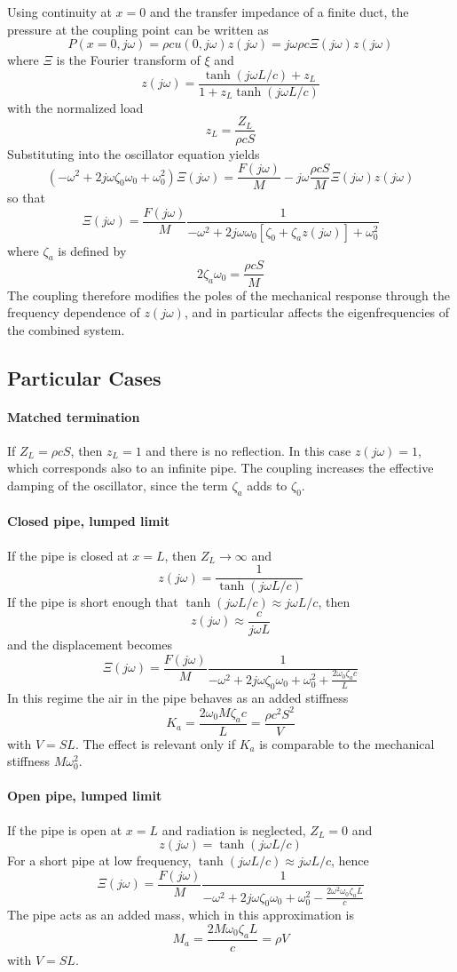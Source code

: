 Using continuity at \( x=0 \) and the transfer impedance of a finite duct, the pressure at the coupling point can be written as
\[
P(x=0,j\omega)=\rho c u(0,j\omega)z(j\omega)=j\omega\rho c \Xi(j\omega)z(j\omega)
\]
where \( \Xi \) is the Fourier transform of \( \xi \) and
\[
z(j\omega)=\frac{\tanh(j\omega L/c)+z_{L}}{1+z_{L}\tanh(j\omega L/c)}
\]
with the normalized load
\[
z_{L}=\frac{Z_{L}}{\rho c S}
\]
Substituting into the oscillator equation yields
\[
\left(-\omega^{2}+2j\omega\zeta_{0}\omega_{0}+\omega_{0}^{2}\right)\Xi(j\omega)=\frac{F(j\omega)}{M}-j\omega\frac{\rho c S}{M}\Xi(j\omega)z(j\omega)
\]
so that
\[
\Xi(j\omega)=\frac{F(j\omega)}{M}\frac{1}{-\omega^{2}+2j\omega\omega_{0}\left[\zeta_{0}+\zeta_{a}z(j\omega)\right]+\omega_{0}^{2}}
\]
where \( \zeta_{a} \) is defined by
\[
2\zeta_{a}\omega_{0}=\frac{\rho c S}{M}
\]
The coupling therefore modifies the poles of the mechanical response through the frequency dependence of \( z(j\omega) \), and in particular affects the eigenfrequencies of the combined system. 

\subsection{Particular Cases}

\paragraph{Matched termination} If \( Z_{L}=\rho c S \), then \( z_{L}=1 \) and there is no reflection. In this case \( z(j\omega)=1 \), which corresponds also to an infinite pipe. The coupling increases the effective damping of the oscillator, since the term \( \zeta_{a} \) adds to \( \zeta_{0} \).

\paragraph{Closed pipe, lumped limit} If the pipe is closed at \( x=L \), then \( Z_{L}\to\infty \) and
\[
z(j\omega)=\frac{1}{\tanh(j\omega L/c)}
\]
If the pipe is short enough that \( \tanh(j\omega L/c)\approx j\omega L/c \), then
\[
z(j\omega)\approx\frac{c}{j\omega L}
\]
and the displacement becomes
\[
\Xi(j\omega)=\frac{F(j\omega)}{M}\frac{1}{-\omega^{2}+2j\omega\zeta_{0}\omega_{0}+\omega_{0}^{2}+\frac{2\omega_{0}\zeta_{a}c}{L}}
\]
In this regime the air in the pipe behaves as an added stiffness
\[
K_{a}=\frac{2\omega_{0}M\zeta_{a}c}{L}=\frac{\rho c^{2}S^{2}}{V}
\]
with \( V=SL \). The effect is relevant only if \( K_{a} \) is comparable to the mechanical stiffness \( M\omega_{0}^{2} \). 

\paragraph{Open pipe, lumped limit} If the pipe is open at \( x=L \) and radiation is neglected, \( Z_{L}=0 \) and
\[
z(j\omega)=\tanh(j\omega L/c)
\]
For a short pipe at low frequency, \( \tanh(j\omega L/c)\approx j\omega L/c \), hence
\[
\Xi(j\omega)=\frac{F(j\omega)}{M}\frac{1}{-\omega^{2}+2j\omega\zeta_{0}\omega_{0}+\omega_{0}^{2}-\frac{2\omega^{2}\omega_{0}\zeta_{a}L}{c}}
\]
The pipe acts as an added mass, which in this approximation is
\[
M_{a}=\frac{2M\omega_{0}\zeta_{a}L}{c}=\rho V
\]
with \( V=SL \).
